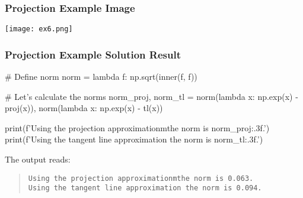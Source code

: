 \documentclass{beamer}
\begin{document}
\begin{frame}[fragile]
\frametitle{Projection Example Image}
\begin{center}
\texttt{[image: ex6.png]}
\end{center}
\end{frame}

\begin{frame}[fragile]
\frametitle{Projection Example Solution Result}
{
\linespread{0.8}
\tiny
\begin{verbatim*}
# Define norm
norm = lambda f: np.sqrt(inner(f, f))

# Let's calculate the norms
norm_proj, norm_tl = norm(lambda x: np.exp(x) - proj(x)), norm(lambda x: np.exp(x) - tl(x))

print(f'Using the projection approximationmthe norm is {norm_proj:.3f}.')
print(f'Using the tangent line approximation the norm is {norm_tl:.3f}.')\end{verbatim*}
}
The output reads:
\begin{quote}
{
\small
\texttt{Using the projection approximationmthe norm is 0.063.}\\
\texttt{Using the tangent line approximation the norm is 0.094.}
}
\end{quote}
\end{frame}
\end{document}
